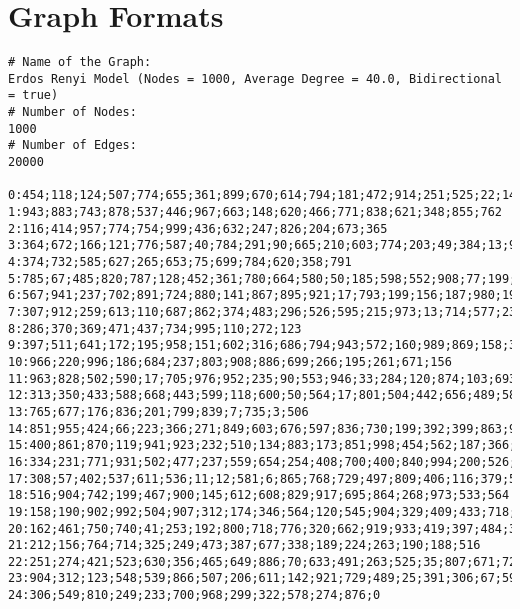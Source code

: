 
\section{Graph Formats}
\label{sec:graph-formats}


\begin{lstlisting}[label={lst:graph-formats:gtna},caption={GTNA graph format}]
# Name of the Graph:
Erdos Renyi Model (Nodes = 1000, Average Degree = 40.0, Bidirectional = true)
# Number of Nodes:
1000
# Number of Edges:
20000

0:454;118;124;507;774;655;361;899;670;614;794;181;472;914;251;525;22;141;24
1:943;883;743;878;537;446;967;663;148;620;466;771;838;621;348;855;762
2:116;414;957;774;754;999;436;632;247;826;204;673;365
3:364;672;166;121;776;587;40;784;291;90;665;210;603;774;203;49;384;13;973
4:374;732;585;627;265;653;75;699;784;620;358;791
5:785;67;485;820;787;128;452;361;780;664;580;50;185;598;552;908;77;199;292;951;466;209;154;364;934;272;947
6:567;941;237;702;891;724;880;141;867;895;921;17;793;199;156;187;980;191;473;343;741;458;870;994
7:307;912;259;613;110;687;862;374;483;296;526;595;215;973;13;714;577;235;676;756;170;90;223;796
8:286;370;369;471;437;734;995;110;272;123
9:397;511;641;172;195;958;151;602;316;686;794;943;572;160;989;869;158;398;814;138;873;415;300;57;205;756;864
10:966;220;996;186;684;237;803;908;886;699;266;195;261;671;156
11:963;828;502;590;17;705;976;952;235;90;553;946;33;284;120;874;103;693;153;255;583;168;478;527
12:313;350;433;588;668;443;599;118;600;50;564;17;801;504;442;656;489;582;84;965;140;666;340;247;902;578
13:765;677;176;836;201;799;839;7;735;3;506
14:851;955;424;66;223;366;271;849;603;676;597;836;730;199;392;399;863;907;209;333;130;885;984
15:400;861;870;119;941;923;232;510;134;883;173;851;998;454;562;187;366;236;382
16:334;231;771;931;502;477;237;559;654;254;408;700;400;840;994;200;526;170
17:308;57;402;537;611;536;11;12;581;6;865;768;729;497;809;406;116;379;520;749;481
18:516;904;742;199;467;900;145;612;608;829;917;695;864;268;973;533;564
19:158;190;902;992;504;907;312;174;346;564;120;545;904;329;409;433;718;422
20:162;461;750;740;41;253;192;800;718;776;320;662;919;933;419;397;484;344
21:212;156;764;714;325;249;473;387;677;338;189;224;263;190;188;516
22:251;274;421;523;630;356;465;649;886;70;633;491;263;525;35;807;671;724;109;921;111;771;30;849;947;994;856;601;52;0
23:904;312;123;548;539;866;507;206;611;142;921;729;489;25;391;306;67;599;84;408;378
24:306;549;810;249;233;700;968;299;322;578;274;876;0
\end{lstlisting}

